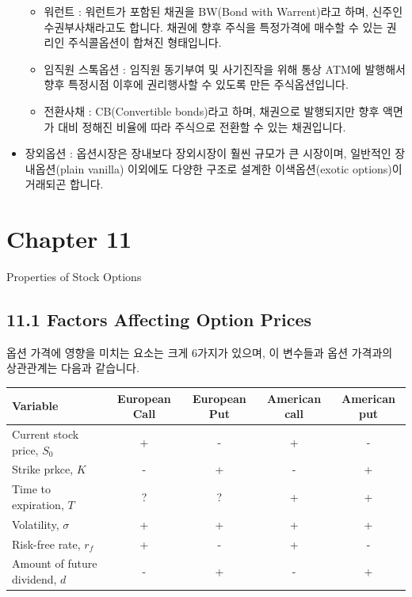 \documentclass[
  letterpaper,
  DIV=11,
  numbers=noendperiod]{scrreprt}
\providecommand{\tightlist}{%
  \setlength{\itemsep}{0pt}\setlength{\parskip}{0pt}}\usepackage{longtable,booktabs,array}
\begin{document}
\begin{itemize}
  \begin{itemize}
  \tightlist
  \item
    워런트 : 워런트가 포함된 채권을 BW(Bond with Warrent)라고 하며,
    신주인수권부사채라고도 합니다. 채권에 향후 주식을 특정가격에 매수할
    수 있는 권리인 주식콜옵션이 합쳐진 형태입니다.
  \item
    임직원 스톡옵션 : 임직원 동기부여 및 사기진작을 위해 통상 ATM에
    발행해서 향후 특정시점 이후에 권리행사할 수 있도록 만든
    주식옵션입니다.
  \item
    전환사채 : CB(Convertible bonds)라고 하며, 채권으로 발행되지만 향후
    액면가 대비 정해진 비율에 따라 주식으로 전환할 수 있는 채권입니다.
  \end{itemize}
\item
  장외옵션 : 옵션시장은 장내보다 장외시장이 훨씬 규모가 큰 시장이며,
  일반적인 장내옵션(plain vanilla) 이외에도 다양한 구조로 설계한
  이색옵션(exotic options)이 거래되곤 합니다.
\end{itemize}

\chapter*{Chapter 11}\label{chapter-11}


Properties of Stock Options

\section*{11.1 Factors Affecting Option
Prices}\label{factors-affecting-option-prices}


옵션 가격에 영향을 미치는 요소는 크게 6가지가 있으며, 이 변수들과 옵션
가격과의 상관관계는 다음과 같습니다.

\begin{longtable}[]{@{}lcccc@{}}
\toprule\noalign{}
Variable & European Call & European Put & American call & American
put \\
\midrule\noalign{}
\endhead
\bottomrule\noalign{}
\endlastfoot
Current stock price, \(S_0\) & + & - & + & - \\
Strike prkce, \(K\) & - & + & - & + \\
Time to expiration, \(T\) & ? & ? & + & + \\
Volatility, \(\sigma\) & + & + & + & + \\
Risk-free rate, \(r_f\) & + & - & + & - \\
Amount of future dividend, \(d\) & - & + & - & + \\
\end{longtable}
\end{document}
